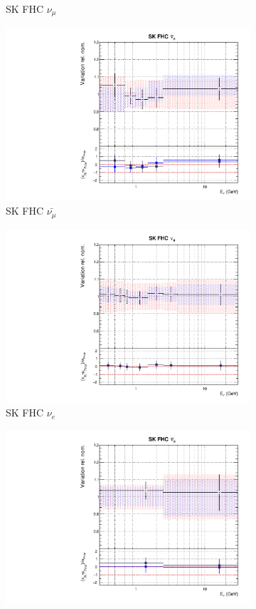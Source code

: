 \begin{figure}[t]
\begin{subfigure}{0.42\textwidth}
  \caption{SK FHC $\nu_{\mu}$}
\end{subfigure}
\begin{subfigure}{0.42\textwidth}
  \centering
  \includegraphics[width=0.75\linewidth]{figs/rhcmpdat28flux_9}
  \caption{SK FHC $\bar{\nu_{\mu}}$}
\end{subfigure}
\begin{subfigure}{0.42\textwidth}
  \centering
  \includegraphics[width=0.75\linewidth]{figs/rhcmpdat248flux_10}
  \caption{SK FHC $\nu_e$}
\end{subfigure}
\begin{subfigure}{0.42\textwidth}
  \centering
  \includegraphics[width=0.75\linewidth]{figs/rhcmpdat28flux_11}

\end{subfigure}
\end{figure}
